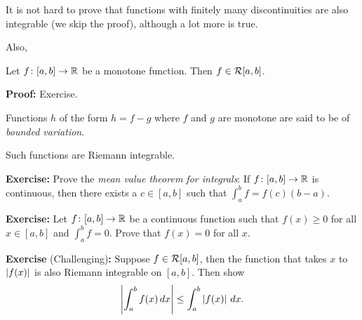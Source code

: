 \documentclass[10pt,aspectratio=149]{beamer}
\begin{document}
\begin{frame}

It is not hard to prove that functions with finitely many discontinuities
are also integrable (we skip the proof),
\pause
although a lot more is true.

\pause
\medskip

Also,

\begin{proposition}
Let $f \colon [a,b] \to {\mathbb{R}}$ be a monotone function.  Then $f \in {\mathcal{R}}[a,b]$.
\end{proposition}

\pause
\textbf{Proof:} Exercise.

\pause
\medskip

Functions $h$ of the form $h=f-g$ where $f$ and $g$ are monotone are said to
be of \emph{bounded variation}.

\pause
\medskip

Such functions are Riemann integrable.

\end{frame}

\begin{frame}

\textbf{Exercise:}
Prove the \emph{mean value theorem for integrals}:
If $f \colon [a,b] \to {\mathbb{R}}$ is continuous, then there exists
a $c \in [a,b]$ such that $\int_a^b f = f(c)(b-a)$.

\pause
\medskip

\textbf{Exercise:}
Let $f \colon [a,b] \to {\mathbb{R}}$ be a continuous function such that $f(x) \geq 0$
for all $x \in [a,b]$ and $\int_a^b f = 0$.  Prove that $f(x) = 0$
for all $x$.

\pause
\medskip

\textbf{Exercise} (Challenging)\textbf{:}
Suppose $f \in {\mathcal{R}}[a,b]$, then the function that takes $x$ to
$\left\lvert {f(x)} \right\rvert$ is also Riemann integrable on $[a,b]$.
\pause
Then show
\[
\left\lvert {\int_a^b f(x)\,dx} \right\rvert \leq \int_a^b \left\lvert {f(x)} \right\rvert\,dx .
\]

\end{frame}
\end{document}
